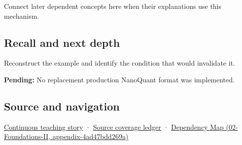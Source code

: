 Connect later dependent concepts here when their explanations use this mechanism.

\subsection{Recall and next depth}\label{appendix-590bbb2424c1-recall-and-next-depth}

Reconstruct the example and identify the condition that would invalidate it.

\textbf{Pending:} No replacement production NanoQuant format was implemented.

\subsection{Source and navigation}\label{appendix-590bbb2424c1-source-and-navigation}

\hyperref[01-foundations-i-ch002-bytes-become-a-durable-agreement]{Continuous teaching story} · \hyperref[appendix-fd090d982a15]{Source coverage ledger} · \href{../02-Foundations-II/main.pdf\#nameddest=appendix-4ad47bdd269a}{Dependency Map (02-Foundations-II, appendix-4ad47bdd269a)}

